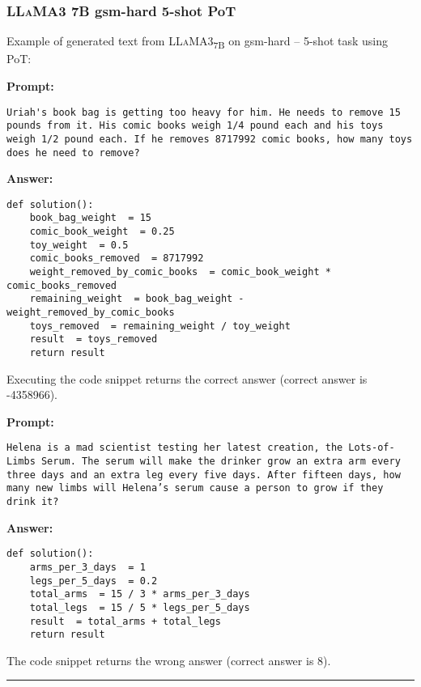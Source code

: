 	\subsubsection*{\textsc{LLaMA}3 7B gsm-hard 5-shot PoT}
	\noindent Example of generated text from \textsc{LLaMA}3\textsubscript{7B} on gsm-hard -- 5-shot task using PoT:
	\begin{displayquote}
		\textbf{Prompt:}
		\begin{Verbatim}[fontsize=\small,breaklines]
Uriah's book bag is getting too heavy for him. He needs to remove 15 pounds from it. His comic books weigh 1/4 pound each and his toys weigh 1/2 pound each. If he removes 8717992 comic books, how many toys does he need to remove?
	\end{Verbatim}
		\textbf{Answer:}
		\begin{Verbatim}[fontsize=\small,breaklines]
def solution():
    book_bag_weight  = 15
    comic_book_weight  = 0.25
    toy_weight  = 0.5
    comic_books_removed  = 8717992
    weight_removed_by_comic_books  = comic_book_weight * comic_books_removed
    remaining_weight  = book_bag_weight - weight_removed_by_comic_books
    toys_removed  = remaining_weight / toy_weight
    result  = toys_removed
    return result
	\end{Verbatim}
	\end{displayquote}
	Executing the code snippet returns the correct answer (correct answer is -4358966).
	\begin{displayquote}
		\textbf{Prompt:}
		\begin{Verbatim}[fontsize=\small,breaklines]
Helena is a mad scientist testing her latest creation, the Lots-of-Limbs Serum. The serum will make the drinker grow an extra arm every three days and an extra leg every five days. After fifteen days, how many new limbs will Helena’s serum cause a person to grow if they drink it?
	\end{Verbatim}
		\textbf{Answer:}
		\begin{Verbatim}[fontsize=\small,breaklines]
def solution():
    arms_per_3_days  = 1
    legs_per_5_days  = 0.2
    total_arms  = 15 / 3 * arms_per_3_days
    total_legs  = 15 / 5 * legs_per_5_days
    result  = total_arms + total_legs
    return result
	\end{Verbatim}
	\end{displayquote}
	The code snippet returns the wrong answer (correct answer is 8).

	\noindent\rule{\textwidth}{0.4pt}

